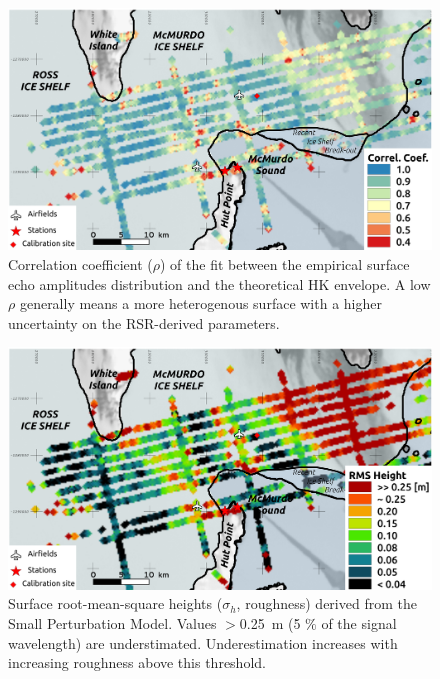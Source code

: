 \documentclass[agums,grl]{agutexSI}
\begin{document}
 
  \begin{figure}
 \noindent\includegraphics[width=\textwidth]{figS4}
\caption{Correlation coefficient ($\rho$) of the fit between the empirical surface echo amplitudes distribution and the theoretical HK envelope. A low $\rho$ generally means a more heterogenous surface with a higher uncertainty on the RSR-derived parameters.}
 \label{correlcoef}
 \end{figure}
 
 
  \begin{figure}
 \noindent\includegraphics[width=\textwidth]{figS5}
\caption{Surface root-mean-square heights ($\sigma_h$, roughness) derived from the Small Perturbation Model. Values $> $0.25~m (5 $\%$ of the signal wavelength) are understimated. Underestimation increases with increasing roughness above this threshold.}
 \label{roughness}
 \end{figure}
 
\end{document}
